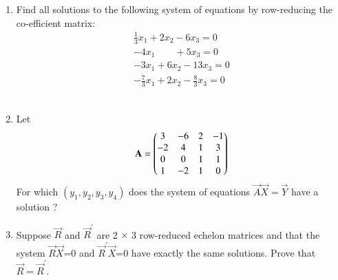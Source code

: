 \renewcommand{\theequation}{\theenumi}
\renewcommand{\thefigure}{\theenumi}
\begin{enumerate}[label=\thesubsection.\arabic*.,ref=\thesubsection.\theenumi]
%
\item Find all solutions to the following system of equations by row-reducing the co-efficient matrix:
\begin{align}
\frac{1}{3}x_1 +2x_2 - 6x_3 =0\\
-4x_1\quad \quad+ 5x_3=0\\
-3x_1+6x_2-13x_3=0\\
-\frac{7}{3}x_1 +2x_2 - \frac{8}{3}x_3 =0
\end{align}
\\
\solution

%
\item Let
\begin{align}
    \mathbf{A}=\begin{pmatrix}3 & -6 & 2 & -1\\-2 & 4 & 1 & 3\\0 & 0 & 1& 1\\1 & -2 & 1 & 0\end{pmatrix} 
\end{align}
For which $(y_1,y_2,y_3,y_4)$ does the system of equations $\vec{A}\vec{X}=\vec{Y}$ have a solution ? 
%
\solution

%
%
\item Suppose $\vec{R}$ and $\vec{R}^{'}$ are 2 $\times$ 3 row-reduced echelon matrices and that the system $\vec{R}$$\vec{X}$=0 and $\vec{R}^{'}\vec{X}$=0 have exactly the same solutions. Prove 
that $\vec{R}=\vec{R}^{'}$.

\solution

\end{enumerate}


